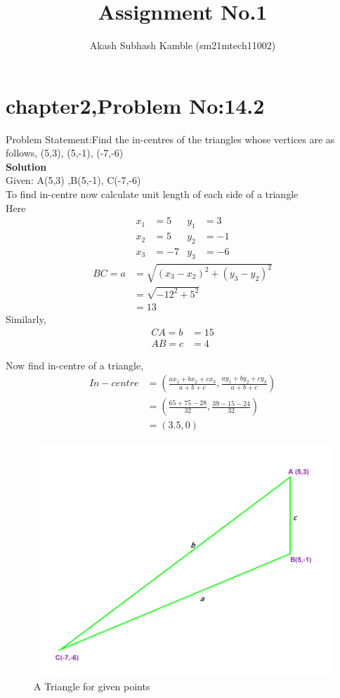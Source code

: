\documentclass[journal,12pt,twocolumn]{IEEEtran}
\begin{document}
\title{Assignment No.1}
\author{Akash Subhash Kamble (sm21mtech11002)}
\maketitle

\section{chapter2,Problem No:14.2}
Problem Statement:Find the in-centres of the triangles whose vertices are as follows,
(5,3), (5,-1), (-7,-6)\\

\textbf{Solution}\\

Given: A(5,3) ,B(5,-1), C(-7,-6)\\

To find in-centre now calculate unit length of each side of a triangle\\
Here 
\begin{align*}
x_1&=5 & y_1&=3\\
x_2&=5 & y_2&=-1\\
x_3&=-7 & y_3&=-6
\end{align*}
\begin{align*}
BC=a&=\sqrt{(x_3-x_2)^2+(y_3-y_2)^2}\\
&=\sqrt{-12^2+5^2}\\
&=13    
\end{align*}
Similarly,
\begin{align*}
CA=b&=15\\
AB=c&=4
\end{align*}

Now find in-centre of a triangle,\\
\begin{align*}
In-centre&=(\frac{ax_1+bx_2+cx_3}{a+b+c},\frac{ay_1+by_2+cy_3}{a+b+c})\\
&=(\frac{65+75-28}{32},\frac{39-15-24}{32})\\
&=(3.5,0)
\end{align*}

\begin{figure}[!ht]
	\centering
	\includegraphics[width=\columnwidth]{tri.png}
	\caption{A Triangle for given points}

\end{figure}
\end{document}
